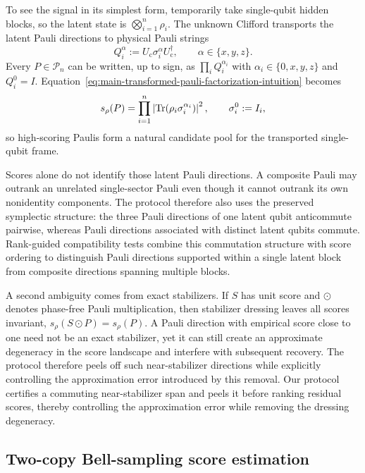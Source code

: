 \documentclass[
  aps,
  prx,
  reprint,
  superscriptaddress,
  amsmath,
  amssymb,
  nofootinbib,
  longbibliography
]{revtex4-2}
\newcommand{\Pc}{\mathcal{P}}
\begin{document}
To see the signal in its simplest form, temporarily take single-qubit hidden
blocks, so the latent state is $\bigotimes_{i=1}^n\rho_i$.  The unknown
Clifford transports the latent Pauli directions to physical Pauli strings
\begin{equation}
Q_i^\alpha
:=
U_{\mathrm c}\sigma_i^\alpha U_{\mathrm c}^\dagger,
\qquad
\alpha\in\{x,y,z\}.
\end{equation}
Every $P\in\Pc_n$ can be written, up to sign, as
$\prod_iQ_i^{\alpha_i}$ with $\alpha_i\in\{0,x,y,z\}$ and $Q_i^0=I$.
Equation~\eqref{eq:main-transformed-pauli-factorization-intuition} becomes
\begin{equation}
s_\rho(P)
=
\prod_{i=1}^n
\left|\Tr\!\left(\rho_i\sigma_i^{\alpha_i}\right)\right|^2,
\qquad
\sigma_i^0:=I_i,
\end{equation}
so high-scoring Paulis form a natural candidate pool for the transported
single-qubit frame.

Scores alone do not identify those latent Pauli directions.  A composite Pauli may
outrank an unrelated single-sector Pauli even though it cannot outrank its own
nonidentity components.  The protocol therefore also uses the preserved
symplectic structure: the three Pauli directions of one latent qubit anticommute pairwise,
whereas Pauli directions associated with distinct latent qubits commute.  
Rank-guided compatibility tests combine this commutation structure with score ordering to distinguish Pauli directions supported within a single latent block from composite directions spanning multiple blocks.


A second ambiguity comes from exact stabilizers.  If $S$ has unit score and
$\odot$ denotes phase-free Pauli multiplication, then stabilizer dressing
leaves all scores invariant, $s_\rho(S\odot P)=s_\rho(P)$.  
A Pauli direction with empirical score close to one need not be an exact stabilizer, yet it can still create an approximate degeneracy in the score landscape and interfere with subsequent recovery. The protocol therefore peels off such near-stabilizer directions while explicitly controlling the approximation error introduced by this removal.
Our protocol  certifies a commuting
near-stabilizer span and peels it before ranking residual scores, thereby
controlling the approximation error while removing the dressing degeneracy.



\subsection{Two-copy Bell-sampling score estimation}
\end{document}
